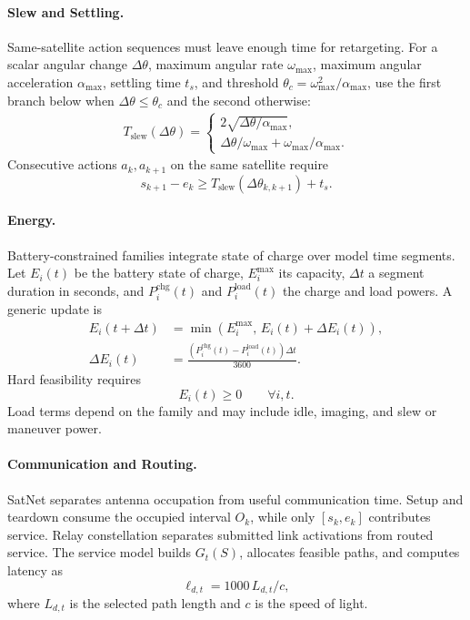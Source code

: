 \documentclass[]{mosi}
\begin{document}
\paragraph{Slew and Settling.} Same-satellite action sequences must leave enough time for retargeting. For a scalar angular change \(\Delta\theta\), maximum angular rate \(\omega_{\max}\), maximum angular acceleration \(\alpha_{\max}\), settling time \(t_s\), and threshold \(\theta_c=\omega_{\max}^2/\alpha_{\max}\), use the first branch below when \(\Delta\theta\le\theta_c\) and the second otherwise:
\[
  \begin{aligned}
  T_{\mathrm{slew}}(\Delta\theta)=
  \begin{cases}
    2\sqrt{\Delta\theta/\alpha_{\max}},\\
    \Delta\theta/\omega_{\max}+\omega_{\max}/\alpha_{\max}.
  \end{cases}
  \end{aligned}
\]
Consecutive actions \(a_k,a_{k+1}\) on the same satellite require
\[
  s_{k+1}-e_k\ge T_{\mathrm{slew}}(\Delta\theta_{k,k+1})+t_s.
\]

\paragraph{Energy.} Battery-constrained families integrate state of charge over model time segments. Let \(E_i(t)\) be the battery state of charge, \(E_i^{\max}\) its capacity, \(\Delta t\) a segment duration in seconds, and \(P_i^{\mathrm{chg}}(t)\) and \(P_i^{\mathrm{load}}(t)\) the charge and load powers. A generic update is
\[
  \begin{aligned}
  E_i(t+\Delta t)&=\min(E_i^{\max},\,E_i(t)+\Delta E_i(t)),\\
  \Delta E_i(t)&=\frac{(P^{\mathrm{chg}}_i(t)-P^{\mathrm{load}}_i(t))\Delta t}{3600}.
  \end{aligned}
\]
Hard feasibility requires
\[
  E_i(t)\ge 0\qquad\forall i,t.
\]
Load terms depend on the family and may include idle, imaging, and slew or maneuver power.

\paragraph{Communication and Routing.} SatNet separates antenna occupation from useful communication time. Setup and teardown consume the occupied interval \(O_k\), while only \([s_k,e_k]\) contributes service. Relay constellation separates submitted link activations from routed service. The service model builds \(G_t(S)\), allocates feasible paths, and computes latency as
\[
  \ell_{d,t}=1000\,L_{d,t}/c,
\]
where \(L_{d,t}\) is the selected path length and \(c\) is the speed of light.
\end{document}
